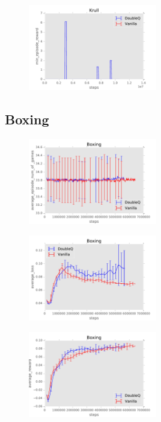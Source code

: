 \documentclass{sig-alternate}
\begin{document}
\begin{figure}[h!]
    \centering
    \includegraphics[width=0.5\textwidth]{../results/Krull/Comparisons/DoubleQ/DoubleQ-baseline-min_episode_reward.pdf}
\end{figure}

\FloatBarrier
\subsection{Boxing}\label{Appendix boxing double}

\begin{figure}[h!]
    \centering
    \includegraphics[width=0.5\textwidth]{../results/Boxing/Comparisons/DoubleQ/DoubleQ-baseline-average_episode_num_of_games.pdf}
\end{figure}


\begin{figure}[h!]
    \centering
    \includegraphics[width=0.5\textwidth]{../results/Boxing/Comparisons/DoubleQ/DoubleQ-baseline-average_loss.pdf}
\end{figure}


\begin{figure}[h!]
    \centering
    \includegraphics[width=0.5\textwidth]{../results/Boxing/Comparisons/DoubleQ/DoubleQ-baseline-average_reward.pdf}
\end{figure}
\end{document}
